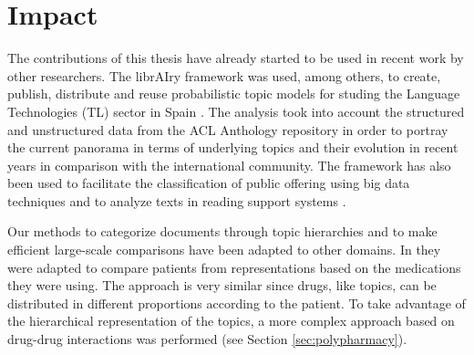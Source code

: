\section{Impact}

The contributions of this thesis have already started to be used in recent work by other researchers. The librAIry framework was used, among others, to create, publish, distribute and reuse probabilistic topic models for studing the Language Technologies (TL) sector in Spain \citep{Samy2019}. The analysis took into account  the structured and unstructured data from the ACL Anthology repository in order to portray the current panorama in terms of underlying topics and their evolution in recent years in comparison with the international community. The framework has also been used to facilitate the classification of public offering using big data techniques \citep{Olga2019} and to analyze texts in reading support systems \citep{Teresa2020}.

Our methods to categorize documents through topic hierarchies and to make efficient large-scale comparisons  have been adapted to other domains. In \citep{Badenes-Olmedo2019c} they were adapted to compare patients from representations based on the medications they were using. The approach is very similar since drugs, like topics, can be distributed in different proportions according to the patient. To take advantage of the hierarchical representation of the topics, a more complex approach based on drug-drug interactions was performed (see Section \ref{sec:polypharmacy}).

